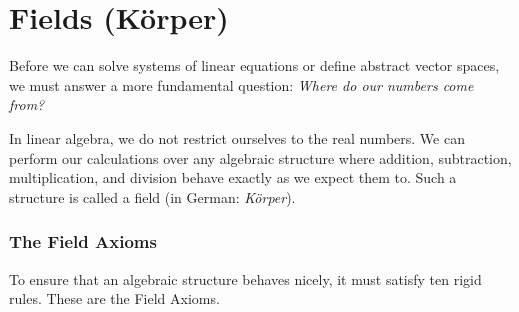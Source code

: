 \renewcommand{\thetheorem}{5.\arabic{theorem}}
\setcounter{theorem}{0}
\setcounter{chapter}{4}
%

\chapter{Fields (Körper)}

Before we can solve systems of linear equations or define abstract vector spaces, we must answer a more fundamental question: \textit{Where do our numbers come from?} 

In linear algebra, we do not restrict ourselves to the real numbers. We can perform our calculations over any algebraic structure where addition, subtraction, multiplication, and division behave exactly as we expect them to. Such a structure is called a field (in German: \textit{Körper}).

\subsection{The Field Axioms}

To ensure that an algebraic structure behaves nicely, it must satisfy ten rigid rules. These are the Field Axioms.

